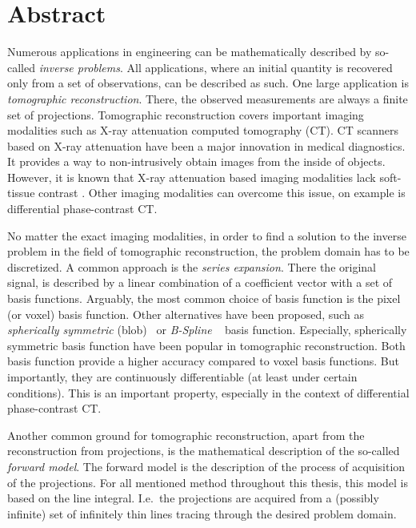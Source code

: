 \chapter*{Abstract}

\noindent%
Numerous applications in engineering can be mathematically described by so-called \textit{inverse
	problems}. All applications, where an initial quantity is recovered only from a set of observations,
can be described as such. One large application is \textit{tomographic reconstruction}. There, the
observed measurements are always a finite set of projections. Tomographic reconstruction covers
important imaging modalities such as X-ray attenuation computed tomography (CT). CT scanners based
on X-ray attenuation have been a major innovation in medical diagnostics. It provides a way to
non-intrusively obtain images from the inside of objects. However, it is known that X-ray
attenuation based imaging modalities lack soft-tissue contrast \cite{pfeiffer_phase_2006}. Other
imaging modalities can overcome this issue, on example is differential phase-contrast CT.

No matter the exact imaging modalities, in order to find a solution to the inverse problem in the
field of tomographic reconstruction, the problem domain has to be discretized. A common approach is
the \textit{series expansion}. There the original signal, is described by a linear combination of a
coefficient vector with a set of basis functions. Arguably, the most common choice of basis function
is the pixel (or voxel) basis function. Other alternatives have been proposed, such as
\textit{spherically symmetric} (blob)~\cite{lewitt_multidimensional_1990} or \textit{B-Spline}
~\cite{unser_fast_1991} basis function. Especially, spherically symmetric basis function have been
popular in tomographic reconstruction. Both basis function provide a higher accuracy compared to
voxel basis functions. But importantly, they are continuously differentiable (at least under certain
conditions). This is an important property, especially in the context of differential phase-contrast
CT\@.

Another common ground for tomographic reconstruction, apart from the reconstruction from
projections, is the mathematical description of the so-called \textit{forward model}. The forward
model is the description of the process of acquisition of the projections. For all mentioned method
throughout this thesis, this model is based on the line integral. I.e.\ the projections are acquired
from a (possibly infinite) set of infinitely thin lines tracing through the desired problem domain.

